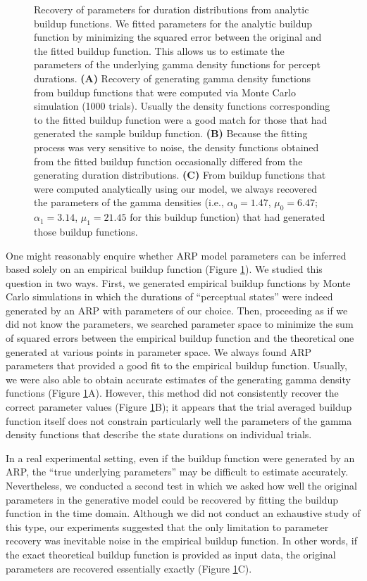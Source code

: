 \begin{figure}
	\caption{Recovery of parameters for duration distributions from analytic buildup functions. We fitted parameters for the analytic buildup function by minimizing the squared error between the original and the fitted buildup function. This allows us to estimate the parameters of the underlying gamma density functions for percept durations. \textbf{(A)} Recovery of generating gamma density functions from buildup functions that were computed via Monte Carlo simulation (1000 trials). Usually the density functions corresponding to the fitted buildup function were a good match for those that had generated the sample buildup function. \textbf{(B)} Because the fitting process was very sensitive to noise, the density functions obtained from the fitted buildup function occasionally differed from the generating duration distributions. \textbf{(C)} From buildup functions that were computed analytically using our model, we always recovered the parameters of the gamma densities (i.e., $\alpha_0=1.47$, $\mu_0=6.47$; $\alpha_1=3.14$, $\mu_1=21.45$ for this buildup function) that had generated those buildup functions.}
	\label{fig:reverse}
\end{figure}

One might reasonably enquire whether ARP model parameters can be inferred based solely on an empirical buildup function (Figure \ref{fig:reverse}). We studied this question in two ways. First, we generated empirical buildup functions by Monte Carlo simulations in which the durations of “perceptual states” were indeed generated by an ARP with parameters of our choice. Then, proceeding as if we did not know the parameters, we searched parameter space to minimize the sum of squared errors between the empirical buildup function and the theoretical one generated at various points in parameter space. We always found ARP parameters that provided a good fit to the empirical buildup function. Usually, we were also able to obtain accurate estimates of the generating gamma density functions (Figure \ref{fig:reverse}A). However, this method did not consistently recover the correct parameter values (Figure \ref{fig:reverse}B); it appears that the trial averaged buildup function itself does not constrain particularly well the parameters of the gamma density functions that describe the state durations on individual trials.

In a real experimental setting, even if the buildup function were generated by an ARP, the “true underlying parameters” may be difficult to estimate accurately. Nevertheless, we conducted a second test in which we asked how well the original parameters in the generative model could be recovered by fitting the buildup function in the time domain. Although we did not conduct an exhaustive study of this type, our experiments suggested that the only limitation to parameter recovery was inevitable noise in the empirical buildup function. In other words, if the exact theoretical buildup function is provided as input data, the original parameters are recovered essentially exactly (Figure \ref{fig:reverse}C).

